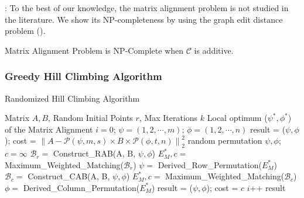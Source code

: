 \documentclass[conference]{IEEEtran}
\begin{document}
{:
To the best of our knowledge, the matrix alignment problem is not studied in the literature. We show its NP-completeness by using the graph edit distance problem (\ged). 


\begin{theorem}
Matrix Alignment Problem is NP-Complete when $\mathcal{C}$ is additive.  
\end{theorem}




\subsubsection{Greedy Hill Climbing Algorithm}


\begin{algorithm}[b!] 
\caption{Randomized Hill Climbing Algorithm}
\label{alg:greedy_alignment}
\begin{algorithmic}[1]
\REQUIRE Matrix $A, B$, Random Initial Points $r$, Max Iterations $k$
\ENSURE Local optimum ($\psi^*, \phi^*$) of the Matrix Alignment
\STATE $i = 0$; $\psi=(1,2,\cdots,m)$; $\phi=(1,2,\cdots,n)$
\STATE result = ($\psi, \phi$); cost = $\left\|A-\mathcal{P}(\psi,m,s)\times B \times \mathcal{P}(\phi,t,n)\right\|_2^2$
  \STATE random permutation $\psi, \phi$; $c = \infty$
    \STATE $\mathcal{B}_r =$ Construct\_RAB(A, B, $\psi,\phi$)
    \STATE $E_M^*, c =$ Maximum\_Weighted\_Matching($\mathcal{B}_r$)
    \STATE $\psi =$ Derived\_Row\_Permutation($E_M^*$)
    \STATE $\mathcal{B}_c =$ Construct\_CAB(A, B, $\psi,\phi$)
    \STATE $E_M^*, c =$ Maximum\_Weighted\_Matching($\mathcal{B}_c$)
    \STATE $\phi =$ Derived\_Column\_Permutation($E_M^*$)
  \ENDFOR
  \STATE result = ($\psi, \phi$); cost = $c$
  \ENDIF
  \STATE $i$++
\ENDWHILE
\RETURN result
\end{algorithmic}
\end{algorithm}




}
\end{document}
